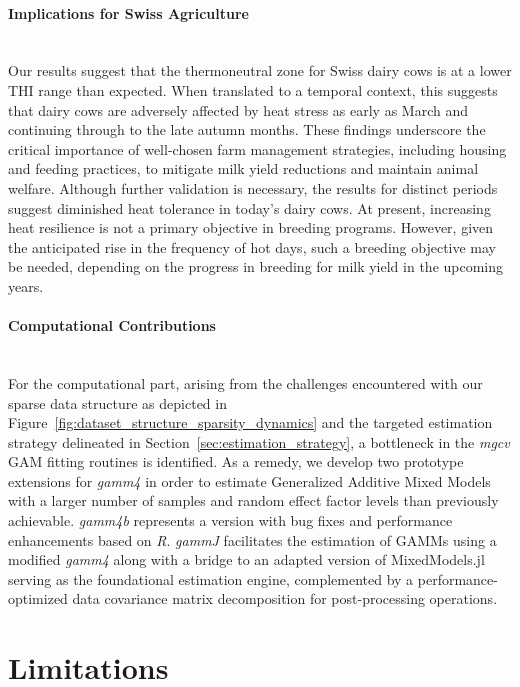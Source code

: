 \paragraph{Implications for Swiss Agriculture} \quad \\
Our results suggest that the thermoneutral zone for Swiss dairy cows is at a lower THI range than expected. When translated to a temporal context, this suggests that dairy cows are adversely affected by heat stress as early as March and continuing through to the late autumn months. These findings underscore the critical importance of well-chosen farm management strategies, including housing and feeding practices, to mitigate milk yield reductions and maintain animal welfare. Although further validation is necessary, the results for distinct periods suggest diminished heat tolerance in today's dairy cows. At present, increasing heat resilience is not a primary objective in breeding programs. However, given the anticipated rise in the frequency of hot days, such a breeding objective may be needed, depending on the progress in breeding for milk yield in the upcoming years.

\paragraph{Computational Contributions} \quad \\
For the computational part, arising from the challenges encountered with our sparse data structure as depicted in Figure~\ref{fig:dataset_structure_sparsity_dynamics} and the targeted estimation strategy delineated in Section~\ref{sec:estimation_strategy}, a bottleneck in the \textit{mgcv} GAM fitting routines is identified. As a remedy, we develop two prototype extensions for \textit{gamm4} in order to estimate Generalized Additive Mixed Models with a larger number of samples and random effect factor levels than previously achievable. \textit{gamm4b} represents a version with bug fixes and performance enhancements based on \textit{R}. \textit{gammJ} facilitates the estimation of GAMMs using a modified \textit{gamm4} along with a bridge to an adapted version of MixedModels.jl serving as the foundational estimation engine, complemented by a performance-optimized data covariance matrix decomposition for post-processing operations.

\section{Limitations}\label{sec:limitations}
